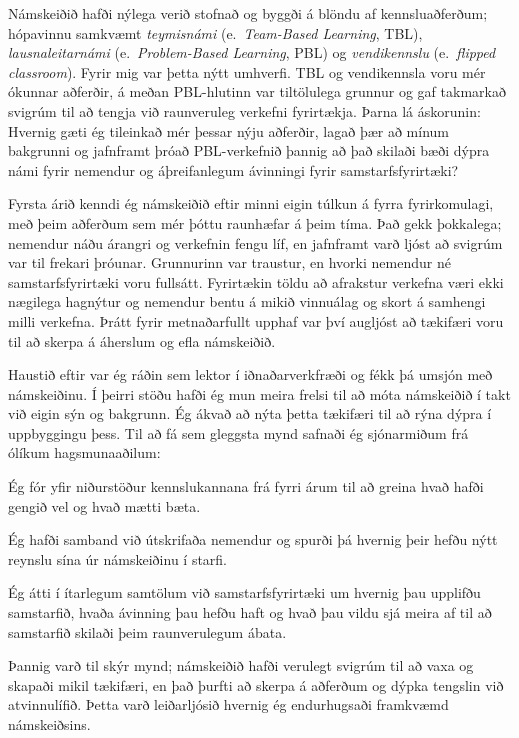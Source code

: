 \documentclass{article}
\begin{document}
Námskeiðið hafði nýlega verið stofnað og byggði á blöndu af kennsluaðferðum; hópavinnu samkvæmt \textit{teymisnámi} (e.~\textit{Team-Based Learning}, TBL), \textit{lausnaleitarnámi} (e.~\textit{Problem-Based Learning}, PBL) og \textit{vendikennslu} (e.~\textit{flipped classroom}). Fyrir mig var þetta nýtt umhverfi. TBL og vendikennsla voru mér ókunnar aðferðir, á meðan PBL-hlutinn var tiltölulega grunnur og gaf takmarkað svigrúm til að tengja við raunveruleg verkefni fyrirtækja. Þarna lá áskorunin: Hvernig gæti ég tileinkað mér þessar nýju aðferðir, lagað þær að mínum bakgrunni og jafnframt þróað PBL-verkefnið þannig að það skilaði bæði dýpra námi fyrir nemendur og áþreifanlegum ávinningi fyrir samstarfsfyrirtæki?

Fyrsta árið kenndi ég námskeiðið eftir minni eigin túlkun á fyrra fyrirkomulagi, með þeim aðferðum sem mér þóttu raunhæfar á þeim tíma. Það gekk þokkalega; nemendur náðu árangri og verkefnin fengu líf, en jafnframt varð ljóst að svigrúm var til frekari þróunar. Grunnurinn var traustur, en hvorki nemendur né samstarfsfyrirtæki voru fullsátt. Fyrirtækin töldu að afrakstur verkefna væri ekki nægilega hagnýtur og nemendur bentu á mikið vinnuálag og skort á samhengi milli verkefna. Þrátt fyrir metnaðarfullt upphaf var því augljóst að tækifæri voru til að skerpa á áherslum og efla námskeiðið.

Haustið eftir var ég ráðin sem lektor í iðnaðarverkfræði og fékk þá umsjón með námskeiðinu. Í þeirri stöðu hafði ég mun meira frelsi til að móta námskeiðið í takt við eigin sýn og bakgrunn. Ég ákvað að nýta þetta tækifæri til að rýna dýpra í uppbyggingu þess. Til að fá sem gleggsta mynd safnaði ég sjónarmiðum frá ólíkum hagsmunaaðilum:
\begin{enumerate*}
\item Ég fór yfir niðurstöður kennslukannana frá fyrri árum til að greina hvað hafði gengið vel og hvað mætti bæta.
\item Ég hafði samband við útskrifaða nemendur og spurði þá hvernig þeir hefðu nýtt reynslu sína úr námskeiðinu í starfi.
\item Ég átti í ítarlegum samtölum við samstarfsfyrirtæki um hvernig þau upplifðu samstarfið, hvaða ávinning þau hefðu haft og hvað þau vildu sjá meira af til að samstarfið skilaði þeim raunverulegum ábata.
\end{enumerate*}

Þannig varð til skýr mynd; námskeiðið hafði verulegt svigrúm til að vaxa og skapaði mikil tækifæri, en það þurfti að skerpa á aðferðum og dýpka tengslin við atvinnulífið. Þetta varð leiðarljósið hvernig ég endurhugsaði framkvæmd námskeiðsins.
\end{document}
